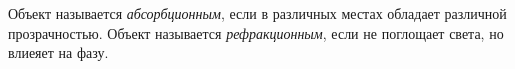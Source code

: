 

\begin{to_def}
    Объект называется \textit{абсорбционным}, если в различных местах обладает различной прозрачностью. Объект называется \textit{рефракционным}, если не поглощает света, но влиеяет на фазу. 
\end{to_def}




